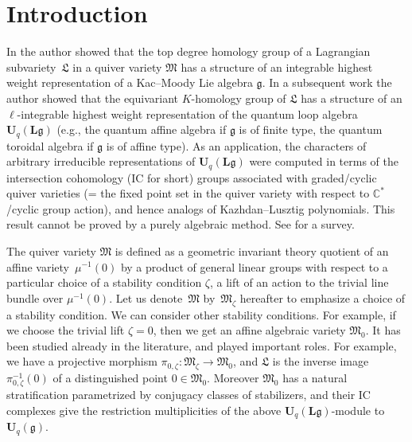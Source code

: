 \documentclass[pdftex]{sigma}
\theoremstyle{definition}
\numberwithin{equation}{section}
\newcommand{\C}{{\mathbb C}}
\newcommand{\g}{{\mathfrak g}}
\newcommand{\M}{{\mathfrak M}} %
\newcommand{\La}{{\mathfrak L}} %
\newcommand{\Uq}{{\mathbf U}_q(\mathfrak g)} %
\newcommand{\Ul}{{\mathbf U}_q({\mathbf L}{\mathfrak g})} %
\begin{document}
\tableofcontents

\renewcommand{\thefootnote}{\arabic{footnote}}
\setcounter{footnote}{0}

\section{Introduction}

In \cite{Na-quiver,Na-alg} the author showed that the top degree
homology group of a Lagrangian subvariety~$\La$ in a quiver variety
$\M$ has a structure of an integrable highest weight representation of
a Kac--Moody Lie algebra $\g$.
In a subsequent work \cite{Na-qaff} the author showed that the
equivariant $K$-homology group of $\La$ has a structure of an
$\ell$-integrable highest weight representation of the quantum loop
algebra $\Ul$ (e.g., the quantum af\/f\/ine algebra if $\g$ is of f\/inite
type, the quantum toroidal algebra if $\g$ is of af\/f\/ine type). As an
application, the characters of arbitrary irreducible representations
of $\Ul$ were computed in terms of the intersection cohomology (IC for
short) groups associated with graded/cyclic quiver varieties (= the
f\/ixed point set in the quiver variety with respect to $\C^*$/cyclic
group action), and hence analogs of Kazhdan--Lusztig polynomials. This
result cannot be proved by a purely algebraic method. See
\cite{MR1989196} for a survey.

The quiver variety $\M$ is def\/ined as a geometric invariant theory
quotient of an af\/f\/ine varie\-ty~$\mu^{-1}(0)$ by a product of general
linear groups with respect to a particular choice of a stability
condition $\zeta$, a lift of an action to the trivial line bundle over
$\mu^{-1}(0)$. Let us denote~$\M$ by~$\M_\zeta$ hereafter to emphasize
a choice of a stability condition.
%
We can consider other stability conditions. For example, if we choose
the trivial lift $\zeta = 0$, then we get an af\/f\/ine algebraic variety
$\M_0$. It has been studied already in the literature, and played
important roles. For example, we have a projective morphism
$\pi_{0,\zeta}\colon\M_\zeta\to \M_0$, and $\La$ is the inverse image
$\pi_{0,\zeta}^{-1}(0)$ of a distinguished point $0\in\M_0$. Moreover
$\M_0$ has a natural stratif\/ication parametrized by conjugacy classes
of stabilizers, and their IC complexes give the restriction
multiplicities of the above $\Ul$-module to $\Uq$.
\end{document}
